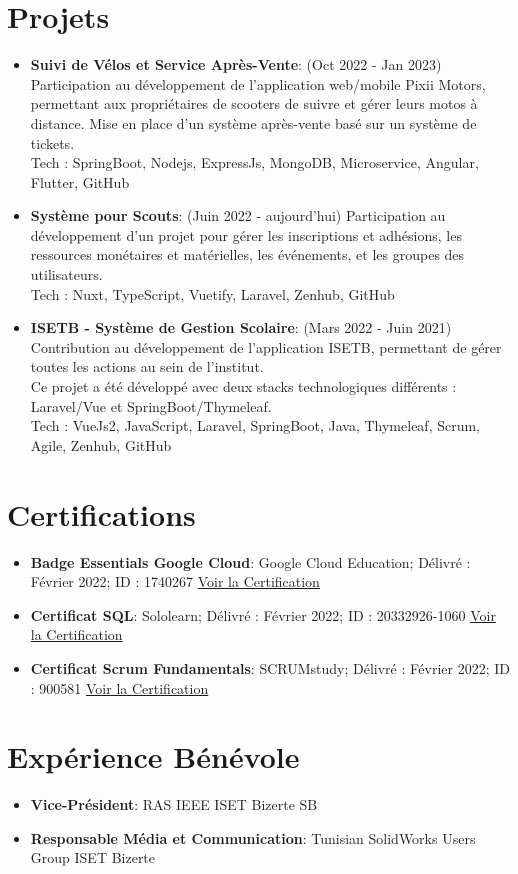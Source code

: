 \documentclass[a4paper,20pt]{article}
\newcommand{\resumeItem}[2]{
  \item\small{
    \textbf{#1}{: #2 \vspace{-2pt}}
  }
}
\newcommand{\resumeSubItem}[2]{\resumeItem{#1}{#2}\vspace{-3pt}}
\newcommand{\resumeSubHeadingListStart}{\begin{itemize}[leftmargin=*]}
\newcommand{\resumeSubHeadingListEnd}{\end{itemize}}
\begin{document}
\vspace{-5pt}
\section{Projets}
\resumeSubHeadingListStart
\resumeSubItem{Suivi de Vélos et Service Après-Vente}{(Oct 2022 - Jan 2023)
 Participation au développement de l'application web/mobile Pixii Motors, permettant aux propriétaires de scooters de suivre et gérer leurs motos à distance. Mise en place d'un système après-vente basé sur un système de tickets.
\\ Tech : SpringBoot, Nodejs, ExpressJs, MongoDB, Microservice, Angular, Flutter, GitHub}
\vspace{2pt}
\resumeSubItem{Système pour Scouts}{(Juin 2022 - aujourd'hui)
 Participation au développement d'un projet pour gérer les inscriptions et adhésions, les ressources monétaires et matérielles, les événements, et les groupes des utilisateurs.
\\ Tech : Nuxt, TypeScript, Vuetify, Laravel, Zenhub, GitHub}
\vspace{2pt}
\resumeSubItem{ISETB - Système de Gestion Scolaire}{(Mars 2022 - Juin 2021)
 Contribution au développement de l'application ISETB, permettant de gérer toutes les actions au sein de l'institut.
 \\\small{Ce projet a été développé avec deux stacks technologiques différents : Laravel/Vue et SpringBoot/Thymeleaf.}
\\ Tech : VueJs2, JavaScript, Laravel, SpringBoot, Java, Thymeleaf, Scrum, Agile, Zenhub, GitHub}
\resumeSubHeadingListEnd

\vspace{-5pt}
\section{Certifications}
\resumeSubHeadingListStart
\resumeSubItem{Badge Essentials Google Cloud}
    {Google Cloud Education; Délivré : Février 2022; ID : 1740267}
    {\href{https://www.cloudskillsboost.google/public_profiles/b6cf5253-6dac-4b50-8a0d-7129daad930b/badges/1740267}{Voir la Certification}}
\resumeSubItem{Certificat SQL}
    {Sololearn; Délivré : Février 2022; ID : 20332926-1060}
    {\href{https://www.sololearn.com/certificates/course/en/20332926/1060/landscape/png}{Voir la Certification}}
\resumeSubItem{Certificat Scrum Fundamentals}
    {SCRUMstudy; Délivré : Février 2022; ID : 900581}
    {\href{https://c46e136a583f7e334124-ac22991740ab4ff17e21daf2ed577041.ssl.cf1.rackcdn.com/Certificate/ScrumFundamentalsCertified-MohamedYoussefChlendi-900581.pdf}{Voir la Certification}}
\resumeSubHeadingListEnd

\vspace{-2pt}
\section{Expérience Bénévole}
\resumeSubHeadingListStart
\resumeItem{Vice-Président}{RAS IEEE ISET Bizerte SB}
\resumeItem{Responsable Média et Communication}{Tunisian SolidWorks Users Group ISET Bizerte}
\resumeSubHeadingListEnd
\end{document}
